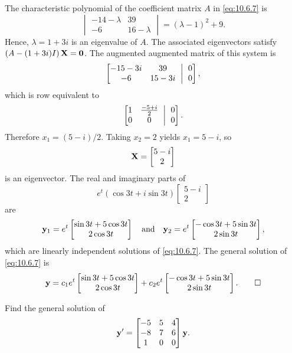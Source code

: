 \begin{solution}
The characteristic polynomial of the coefficient matrix $A$
in \eqref{eq:10.6.7} is
\[
\begin{vmatrix}-14-\lambda&39\\-6&16-\lambda\end{vmatrix}=(\lambda-1)^2+9.
\]
Hence, $\lambda=1+3i$ is an eigenvalue of $A$. The associated
eigenvectors satisfy $\left(A-(1+3i)I\right)\mathbf{X}=\mathbf{0}$. The
augmented augmented matrix of this system is
\[
\amatrix{-15-3i&39\\-6&15-3i}{0\\0},
 \]
which is row equivalent to
\[
\amatrix{1&\frac{-5+i}{2}\\0&0}{0\\0}.
\]
Therefore $x_1=(5-i)/2$. Taking $x_2=2$ yields $x_1=5-i$, so
\[
\mathbf{X}=\begin{bmatrix}5-i\\2\end{bmatrix}
\]
is an eigenvector. The real and imaginary parts of
\[
e^t(\cos3t+i\sin3t)\begin{bmatrix}5-i\\2\end{bmatrix}
\]
 are
\[
\mathbf{y}_1=e^t\begin{bmatrix}\sin3t+5\cos3t\\2\cos3t\end{bmatrix}
\quad\text{and}\quad
\mathbf{y}_2=e^t\begin{bmatrix}-\cos3t+5\sin3t\\2\sin3t\end{bmatrix},
 \]
which are  linearly independent solutions of  \eqref{eq:10.6.7}.
The general solution of \eqref{eq:10.6.7} is
\[
\mathbf{y}=c_1e^t\begin{bmatrix}\sin3t+5\cos3t\\2\cos3t\end{bmatrix}+
c_2e^t\begin{bmatrix}-\cos3t+5\sin3t\\2\sin3t\end{bmatrix}.\qedhere
\]
\end{solution}

\begin{example}\label{example:10.6.3}
 Find the general solution of
\begin{equation} \label{eq:10.6.8}
\mathbf{y}'=\begin{bmatrix}-5&5&4\\-8&7&6\\1&0&0\end{bmatrix}\mathbf{y}.
\end{equation}
\end{example}


